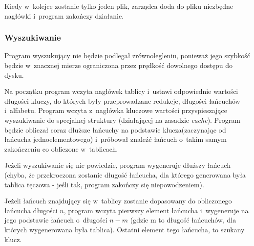 \documentclass[a4paper]{scrartcl}
\begin{document}
Kiedy w~kolejce zostanie tylko jeden plik, zarządca doda do pliku niezbędne nagłówki i~program zakończy działanie.

\subsubsection{Wyszukiwanie}
Program wyszukujący nie będzie podlegał zrównolegleniu, ponieważ jego szybkość będzie w~znacznej mierze ograniczona przez prędkość dowolnego dostępu do dysku.

Na początku program wczyta nagłówek tablicy i~ustawi odpowiednie wartości długości kluczy, do których były przeprowadzane redukcje, długości łańcuchów i~alfabetu.
Program wczyta z~nagłówka kluczowe wartości przyspieszające wyszukiwanie do specjalnej struktury (działającej na zasadzie \emph{cache}).
Program będzie obliczał coraz dłuższe łańcuchy na podstawie klucza(zaczynając od łańcucha jednoelementowego) i~próbował znaleźć łańcuch o~takim samym zakończeniu co obliczone w~tablicach.

Jeżeli wyszukiwanie się nie powiedzie, program wygeneruje dłuższy łańcuch (chyba, że przekroczona zostanie długość łańcucha, dla którego generowana była tablica tęczowa - jeśli tak, program zakończy się niepowodzeniem).

Jeżeli łańcuch znajdujący się w~tablicy zostanie dopasowany do obliczonego łańcucha długości $n$, program wczyta pierwszy element łańcucha i~wygeneruje na jego podstawie łańcuch o~długości $n-m$ (gdzie m to długość łańcuchów, dla których wygenerowana była tablica). Ostatni element tego łańcucha, to szukany klucz.
\end{document}
